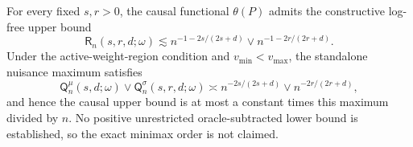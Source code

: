 For every fixed \(s,r>0\), the causal functional \(\theta(P)\) admits the constructive log-free upper bound
\[
\mathsf R_n(s,r,d;\omega)
\lesssim n^{-1-2s/(2s+d)}\vee n^{-1-2r/(2r+d)}.
\]
Under the active-weight-region condition and \(v_{\min}<v_{\max}\), the standalone nuisance maximum satisfies
\[
\mathsf Q_n^{\mu}(s,d;\omega)\vee\mathsf Q_n^{\sigma}(s,r,d;\omega)
\asymp n^{-2s/(2s+d)}\vee n^{-2r/(2r+d)},
\]
and hence the causal upper bound is at most a constant times this maximum divided by \(n\).  No positive unrestricted oracle-subtracted lower bound is established, so the exact minimax order is not claimed.